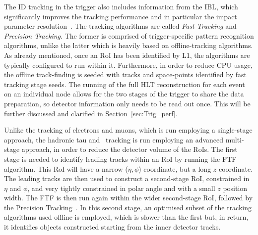 				The ID tracking in the trigger also includes information from the IBL, which significantly improves the tracking performance and in particular the impact parameter resolution~\cite{IBLTDR}. The tracking algorithms are called \emph{Fast Tracking} and \emph{Precision Tracking}. The former is comprised of trigger-specific pattern recognition algorithms, unlike the latter which is heavily based on offline-tracking algorithms.
				As already mentioned, once an \ac{RoI} has been identified by \ac{L1}, the algorithms are typically configured to run within it. Furthermore, in order to reduce \ac{CPU} usage, the offline track-finding is seeded with tracks and space-points identified by fast tracking stage seeds. The running of the full \ac{HLT} reconstruction for each event on an individual node allows for the two stages of the trigger to share the data preparation, so detector information only needs to be read out once. This will be further discussed and clarified in Section~\ref{sec:Trig_perf}. 

				Unlike the tracking of electrons and muons, which is run employing a single-stage approach, the hadronic tau and \bj\ tracking is run employing an advanced multi-stage approach, in order to reduce the detector volume of the \acp{RoI}. The first stage is needed to identify leading tracks within an \ac{RoI} by running the \ac{FTF} algorithm. This \ac{RoI} will have a narrow ($\eta, \phi$) coordinate, but a long $z$ coordinate. The leading tracks are then used to construct a second-stage \ac{RoI}, constrained in $\eta$ and $\phi$, and very tightly constrained in polar angle and with a small $z$ position width. The \ac{FTF} is then run again within the wider second-stage \ac{RoI}, followed by the Precision Tracking~\cite{ATLASTrigger2015, Miano:2016oty}. In this second stage, an optimised subset of the tracking algorithms used offline is employed, which is slower than the first but, in return, it identifies objects constructed starting from the inner detector tracks.



